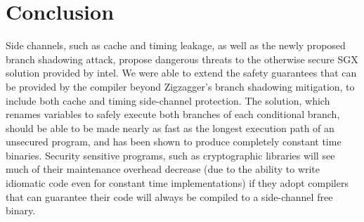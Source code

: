 \documentclass[sigplan, review]{acmart}
\begin{document}
\section{Conclusion}
Side channels, such as cache and timing leakage, as well as the newly proposed branch shadowing attack, propose dangerous threats to the otherwise secure SGX solution provided by intel. We were able to extend the safety guarantees that can be provided by the compiler beyond Zigzagger’s branch shadowing mitigation, to include both cache and timing side-channel protection. The solution, which renames variables to safely execute both branches of each conditional branch, should be able to be made nearly as fast as the longest execution path of an unsecured program, and has been shown to produce completely constant time binaries. Security sensitive programs, such as cryptographic libraries will see much of their maintenance overhead decrease (due to the ability to write idiomatic code even for constant time implementations) if they adopt compilers that can guarantee their code will always be compiled to a side-channel free binary.


{
}
\end{document}
